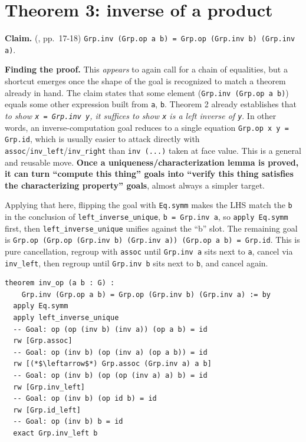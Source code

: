 \section{Theorem 3: inverse of a product}\label{sec:08-group-theorems:04-theorem-3:1}

\textbf{Claim.} (\cite{DummitFoote2003}, pp.~17-18) \texttt{Grp.inv (Grp.op a b) = Grp.op (Grp.inv b) (Grp.inv a)}.

\textbf{Finding the proof.} This \emph{appears} to again call for a chain of equalities, but a shortcut emerges once the shape of the goal is recognized to match a theorem already in hand. The claim states that some element (\texttt{Grp.inv (Grp.op a b)}) equals some other expression built from \texttt{a}, \texttt{b}. Theorem 2 already establishes that \emph{to show \texttt{x = Grp.inv y}, it suffices to show \texttt{x} is a left inverse of \texttt{y}}. In other words, an inverse-computation goal reduces to a single equation \texttt{Grp.op x y = Grp.id}, which is usually easier to attack directly with \texttt{assoc}/\texttt{inv\_\allowbreak{}left}/\texttt{inv\_\allowbreak{}right} than \texttt{inv (...)} taken at face value. This is a general and reusable move. \textbf{Once a uniqueness/characterization lemma is proved, it can turn ``compute this thing'' goals into ``verify this thing satisfies the characterizing property'' goals}, almost always a simpler target.

Applying that here, flipping the goal with \texttt{Eq.symm} makes the LHS match the \texttt{b} in the conclusion of \texttt{left\_\allowbreak{}inverse\_\allowbreak{}unique}, \texttt{b = Grp.inv a}, so \texttt{apply Eq.symm} first, then \texttt{left\_\allowbreak{}inverse\_\allowbreak{}unique} unifies against the ``b'' slot. The remaining goal is \texttt{Grp.op (Grp.op (Grp.inv b) (Grp.inv a)) (Grp.op a b) = Grp.id}. This is pure cancellation, regroup with \texttt{assoc} until \texttt{Grp.inv a} sits next to \texttt{a}, cancel via \texttt{inv\_\allowbreak{}left}, then regroup until \texttt{Grp.inv b} sits next to \texttt{b}, and cancel again.

\begin{lstlisting}
theorem inv_op (a b : G) :
    Grp.inv (Grp.op a b) = Grp.op (Grp.inv b) (Grp.inv a) := by
  apply Eq.symm
  apply left_inverse_unique
  -- Goal: op (op (inv b) (inv a)) (op a b) = id
  rw [Grp.assoc]
  -- Goal: op (inv b) (op (inv a) (op a b)) = id
  rw [(*$\leftarrow$*) Grp.assoc (Grp.inv a) a b]
  -- Goal: op (inv b) (op (op (inv a) a) b) = id
  rw [Grp.inv_left]
  -- Goal: op (inv b) (op id b) = id
  rw [Grp.id_left]
  -- Goal: op (inv b) b = id
  exact Grp.inv_left b
\end{lstlisting}


